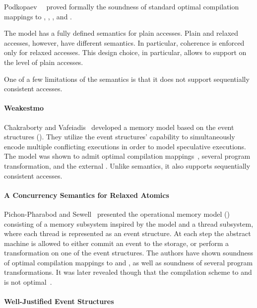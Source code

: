 Podkopaev~\etal~\cite{Podkopaev-al:ECOOP17, Podkopaev-al:POPL19} 
proved formally the soundness of standard optimal 
compilation mappings to \Intel, , , and \POWER.

The model has a fully defined semantics for plain accesses.  
Plain and relaxed accesses, however, have different semantics.
In particular, coherence is enforced only for relaxed accesses. 
This design choice, in particular, allows to support 
\CSE on the level of plain accesses. 

One of a few limitations of the \Promising semantics is that 
it does not support sequentially consistent accesses. 

\paragraph{Weakestmo}

Chakraborty and Vafeiadis~\cite{Chakraborty-Vafeiadis:CGO17, Chakraborty-Vafeiadis:POPL19}
developed a memory model based on the event structures (\WMO). 
They utilize the event structures' capability to simultaneously encode 
multiple conflicting executions in order to model speculative executions.
The model was shown to admit optimal compilation mappings~\cite{Moiseenko-al:ECOOP20},
several program transformation, and the external \DRF.
Unlike \Promising semantics, it also supports 
sequentially consistent accesses.

\paragraph{A Concurrency Semantics for Relaxed Atomics}

Pichon-Pharabod and Sewell~\cite{PichonPharabod-Sewell:POPL16} 
presented the operational memory model (\CSRA) consisting of 
a memory subsystem inspired by the \POWER model 
and a thread subsystem, 
where each thread is represented as an event structure. 
At each step the abstract machine is allowed to either 
commit an event to the storage, or perform a transformation 
on one of the event structures. 
The authors have shown soundness of 
optimal compilation mappings to \Intel and \POWER, 
as well as soundness of several program transformations.
It was later revealed though that the compilation scheme
to  and  is not optimal~\cite{PichonPharabod:PhD18}.

\paragraph{Well-Justified Event Structures}

